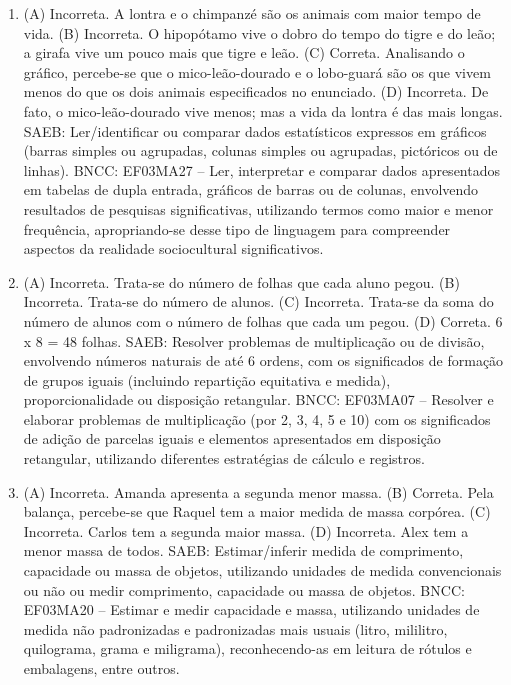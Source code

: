 \begin{enumerate}
\item
(A) Incorreta. A lontra e o chimpanzé são os animais com maior tempo de vida.
(B) Incorreta. O hipopótamo vive o dobro do tempo do tigre e do leão; a girafa vive um pouco mais que tigre e leão.
(C) Correta. Analisando o gráfico, percebe-se que o mico-leão-dourado e o lobo-guará são os que vivem menos do que os dois animais especificados no enunciado.
(D) Incorreta. De fato, o mico-leão-dourado vive menos; mas a vida da lontra é das mais longas.
SAEB: Ler/identificar ou comparar dados estatísticos
expressos em gráficos (barras simples ou agrupadas, colunas simples ou agrupadas, pictóricos ou de linhas).
BNCC: EF03MA27 -- Ler, interpretar e comparar dados apresentados em tabelas de dupla entrada,
gráficos de barras ou de colunas, envolvendo resultados de pesquisas significativas, utilizando
termos como maior e menor frequência, apropriando-se desse tipo de linguagem para
compreender aspectos da realidade sociocultural significativos.

\item
(A) Incorreta. Trata-se do número de folhas que cada aluno pegou.
(B) Incorreta. Trata-se do número de alunos.
(C) Incorreta. Trata-se da soma do número de alunos com o número de folhas que cada um pegou.
(D) Correta. 6 x 8 = 48 folhas.
SAEB: Resolver problemas de multiplicação ou de divisão, envolvendo números naturais de até 6 ordens, com os significados de formação de grupos iguais (incluindo repartição equitativa e medida), proporcionalidade ou disposição retangular.
BNCC: EF03MA07 – Resolver e elaborar problemas de multiplicação (por 2, 3, 4, 5 e 10) com os
significados de adição de parcelas iguais e elementos apresentados em disposição retangular,
utilizando diferentes estratégias de cálculo e registros.

\item
(A) Incorreta. Amanda apresenta a segunda menor massa.
(B) Correta. Pela balança, percebe-se que Raquel tem a maior medida de massa corpórea.
(C) Incorreta. Carlos tem a segunda maior massa.
(D) Incorreta. Alex tem a menor massa de todos.
SAEB: Estimar/inferir medida de comprimento, capacidade ou
massa de objetos, utilizando unidades de medida convencionais ou não ou
medir comprimento, capacidade ou massa de objetos.
BNCC: EF03MA20 -- Estimar e medir capacidade e massa, utilizando unidades de medida não
padronizadas e padronizadas mais usuais (litro, mililitro, quilograma, grama e miligrama),
reconhecendo-as em leitura de rótulos e embalagens, entre outros.
\end{enumerate}

